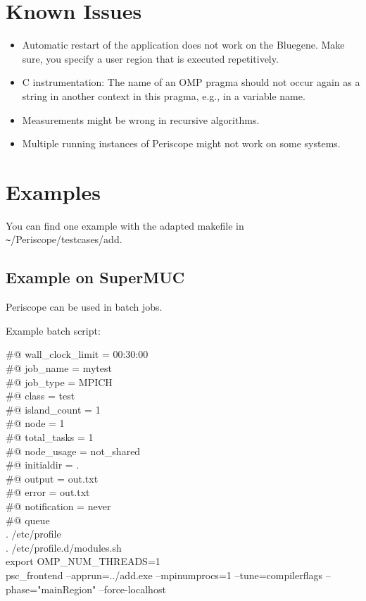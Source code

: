 \documentclass[11pt,oneside,a4paper]{book}
\begin{document}
\chapter{Known Issues}
\begin{itemize}
 \item Automatic restart of the application does not work on the Bluegene. Make sure, you specify a user region that is executed repetitively.
 \item C instrumentation: The name of an OMP pragma should not occur again as a string in another context in this pragma, e.g., in a variable name.
 \item Measurements might be wrong in recursive algorithms.
 \item Multiple running instances of Periscope might not work on some systems.
\end{itemize}

\chapter*{Examples}

You can find one example with the adapted makefile in \verb|~|/Periscope/testcases/add.

\section*{Example on SuperMUC}

Periscope can be used in batch jobs.

Example batch script:\newline

\#@ wall\_clock\_limit = 00:30:00\\
\#@ job\_name = mytest\\
\#@ job\_type = MPICH\\
\#@ class = test\\
\#@ island\_count = 1\\
\#@ node = 1\\
\#@ total\_tasks = 1\\
\#@ node\_usage = not\_shared\\
\#@ initialdir = .\\
\#@ output = out.txt\\
\#@ error = out.txt\\
\#@ notification = never\\
\#@ queue\\
. /etc/profile\\
. /etc/profile.d/modules.sh\\

export OMP\_NUM\_THREADS=1\\
psc\_frontend --apprun=../add.exe --mpinumprocs=1 --tune=compilerflags --phase="mainRegion" --force-localhost
\end{document}
